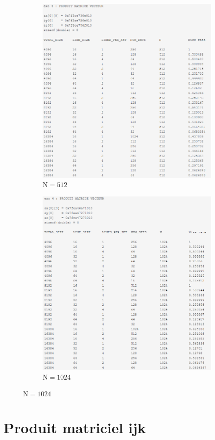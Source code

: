 \documentclass[12pt]{base}
\begin{document}
\begin{figure}[H]
\begin{subfigure}[H]{0.5\linewidth}
    \centering
    \includegraphics[width=0.75\linewidth]{2_vect_512.png}
    \caption{$\text{N}=512$}
    \label{fig:2_512}
\end{subfigure}
\begin{subfigure}[H]{0.5\linewidth}
    \centering
    \includegraphics[width=0.75\linewidth]{2_vect_1024.png}
    \caption{$\text{N}=1024$}
    \label{fig:2_1024}
\end{subfigure}
\end{figure}

\newpage
\section{Produit matriciel ijk}
\end{document}

